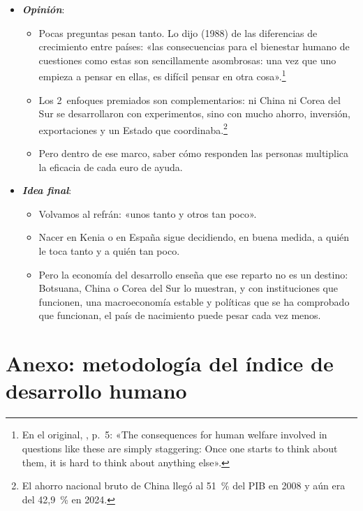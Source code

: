 \documentclass[11pt]{article}
\begin{document}
\begin{itemize}
\begin{itemize}
  \end{itemize}
\item \textbf{\emph{Opinión}}:
  \begin{itemize}
  \item Pocas preguntas pesan tanto. Lo dijo  (1988) de las diferencias de crecimiento entre países: «las consecuencias para el bienestar humano de cuestiones como estas son sencillamente asombrosas: una vez que uno empieza a pensar en ellas, es difícil pensar en otra cosa».\footnote{En el original, \textcite{Lucas1988}, p.~5: «The consequences for human welfare involved in questions like these are simply staggering: Once one starts to think about them, it is hard to think about anything else».}

  \item Los 2~enfoques premiados son complementarios: ni China ni Corea del Sur se desarrollaron con experimentos, sino con mucho ahorro, inversión, exportaciones y un Estado que coordinaba.\footnote{El ahorro nacional bruto de China llegó al 51~\% del PIB en 2008 y aún era del 42,9~\% en 2024\nocite{FMI2026WEOdatos}.}

  \item Pero dentro de ese marco, saber cómo responden las personas multiplica la eficacia de cada euro de ayuda.
  \end{itemize}
\item \textbf{\emph{Idea final}}:
  \begin{itemize}
  \item Volvamos al refrán: «unos tanto y otros tan poco».

  \item Nacer en Kenia o en España sigue decidiendo, en buena medida, a quién le toca tanto y a quién tan poco.

  \item Pero la economía del desarrollo enseña que ese reparto no es un destino: Botsuana, China o Corea del Sur lo muestran, y con instituciones que funcionen, una macroeconomía estable y políticas que se ha comprobado que funcionan, el país de nacimiento puede pesar cada vez menos.
  \end{itemize}
\end{itemize}

\clearpage
\appendix

\section{Anexo: metodología del índice de desarrollo humano}\label{anexo:idh}
\end{document}
